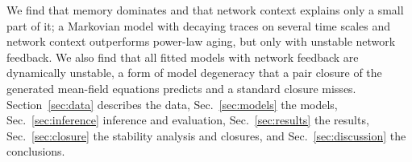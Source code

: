 We find that memory dominates and that network context explains only a small part of it; a Markovian model with decaying traces on several time scales and network context outperforms power-law aging, but only with unstable network feedback.
We also find that all fitted models with network feedback are dynamically unstable, a form of model degeneracy that a pair closure of the generated mean-field equations predicts and a standard closure misses.
Section~\ref{sec:data} describes the data, Sec.~\ref{sec:models} the models, Sec.~\ref{sec:inference} inference and evaluation, Sec.~\ref{sec:results} the results, Sec.~\ref{sec:closure} the stability analysis and closures, and Sec.~\ref{sec:discussion} the conclusions.
